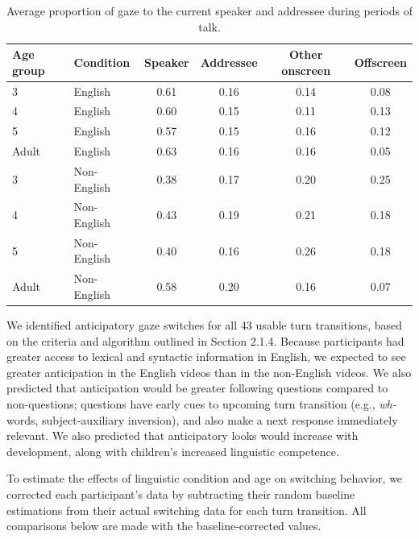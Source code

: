 \documentclass[authoryear, 12pt]{elsarticle}
\begin{document}
\begin{table}[H]
\begin{center}
  \begin{tabular}{llcccc}
    \hline
    Age group & Condition & Speaker & Addressee & Other onscreen & Offscreen\\ 
    \hline
    3 & English & 0.61 & 0.16 & 0.14 & 0.08 \\ 
    4 & English & 0.60 & 0.15 & 0.11 & 0.13 \\ 
    5 & English & 0.57 & 0.15 & 0.16 & 0.12 \\ 
    Adult & English & 0.63 & 0.16 & 0.16 & 0.05 \\ 
    3 & Non-English & 0.38 & 0.17 & 0.20 & 0.25 \\ 
    4 & Non-English & 0.43 & 0.19 & 0.21 & 0.18 \\ 
    5 & Non-English & 0.40 & 0.16 & 0.26 & 0.18 \\ 
    Adult & Non-English & 0.58 & 0.20 & 0.16 & 0.07 \\ 
    \hline
  \end{tabular}
\end{center}
  \caption{Average proportion of gaze to the current speaker and addressee during periods of talk.}
\label{looktableexp1}
\end{table}

We identified anticipatory gaze switches for all 43 usable turn transitions, based on the criteria and algorithm outlined in Section 2.1.4. Because participants had greater access to lexical and syntactic information in English, we expected to see greater anticipation in the English videos than in the non-English videos. We also predicted that anticipation would be greater following questions compared to non-questions; questions have early cues to upcoming turn transition (e.g., \textit{wh-} words, subject-auxiliary inversion), and also make a next response immediately relevant. We also predicted that anticipatory looks would increase with development, along with children's increased linguistic competence.

To estimate the effects of linguistic condition and age on switching behavior, we corrected each participant's data by subtracting their random baseline estimations from their actual switching data for each turn transition. All comparisons below are made with the baseline-corrected values.
\end{document}
